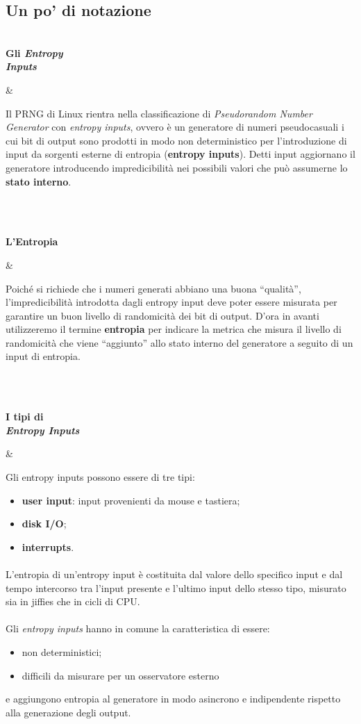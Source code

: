 \documentclass{article}
\newcommand{\knizPar}[3]{%
  \parbox[t]{0.15\textwidth}{\footnotesize
  \textbf{#1\\#2}}&\parbox[t]{0.85\textwidth}{%
    \hspace{1.5em}#3
    \vspace{\parsep}%
  }\\\\}
\begin{document}
 \subsection{Un po' di notazione}\label{notazione}
 \knizPar{}{Gli \emph{Entropy \\Inputs}}{Il PRNG di Linux
 rientra nella classificazione di \emph{Pseudorandom Number Generator} con \emph{entropy inputs}, ovvero è un
 generatore di numeri pseudocasuali i cui bit di output sono prodotti in modo
 non deterministico per l'introduzione di input da sorgenti esterne di entropia
 (\textbf{entropy inputs}). Detti input aggiornano il generatore introducendo
 impredicibilità nei possibili valori che può assumerne lo \textbf{stato
 interno}.}
 \knizPar{L'Entropia}{}{Poiché si richiede che i numeri generati abbiano una
 buona ``qualità'', l'impredicibilità introdotta dagli entropy input deve poter essere
 misurata per garantire un buon livello di randomicità dei bit di output. D'ora
 in avanti utilizzeremo il termine \textbf{entropia} per indicare la
 metrica che misura il livello di randomicità che viene ``aggiunto'' allo stato interno
 del generatore a seguito di un input di entropia. }
 \knizPar{I tipi di}{\emph{Entropy Inputs}}{ Gli entropy inputs possono essere
 di tre tipi:
 \begin{itemize}
   \item \textbf{user input}: input provenienti da mouse e tastiera;
   \item \textbf{disk I/O};
   \item \textbf{interrupts}.
 \end{itemize}
 \paragraph{}L'entropia di un'entropy input è costituita dal valore dello
 specifico input e dal tempo intercorso tra l'input presente e l'ultimo input
 dello stesso tipo, misurato sia in jiffies che in cicli di CPU. 
 
 \paragraph{}Gli \emph{entropy inputs} hanno in comune la
 caratteristica di essere:
 \begin{itemize}
   \item non deterministici;
   \item difficili da misurare per un osservatore esterno
 \end{itemize}
e aggiungono entropia al generatore in modo asincrono e
 indipendente rispetto alla generazione degli output. 
 }
 
\end{document}
